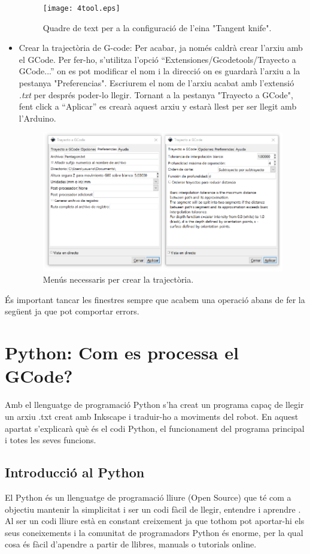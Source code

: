 \begin{itemize}
	\begin{figure}[H]
		\centering
		\texttt{[image: 4tool.eps]}
		\caption{Quadre de text per a la configuració de l'eina "Tangent knife".}
		\label{fig:tool}
	\end{figure}
	
	\item Crear la trajectòria de G-code: Per acabar, ja només caldrà crear l'arxiu amb el GCode. Per fer-ho, s'utilitza l'opció “Extensiones/Gcodetools/Trayecto a GCode...” on es pot modificar el nom i la direcció on es guardarà l'arxiu a la pestanya "Preferencias". Escriurem el nom de l'arxiu acabat amb l'extensió \emph{.txt} per després poder-lo llegir. Tornant a la pestanya "Trayecto a GCode", fent click a  “Aplicar” es crearà aquest arxiu y estarà llest per ser llegit amb l'Arduino.
	
	\begin{figure}[H]
		\centering
		\includegraphics[width=0.60\linewidth]{5Trajectoria.eps}
		\caption{Menús necessaris per crear la trajectòria.}
		\label{fig:trayecto}
	\end{figure}
	
\end{itemize}
És important tancar les finestres sempre que acabem una operació abans de fer la següent ja que pot comportar errors. 

\section{Python: Com es processa el GCode?}

Amb el llenguatge de programació Python s’ha creat un programa capaç de llegir un arxiu .txt creat amb Inkscape i traduir-ho a moviments del robot. En aquest apartat s’explicarà què és el codi Python, el funcionament del programa principal i totes les seves funcions. 

\subsection{Introducció al Python}
El Python és un llenguatge de programació lliure (Open Source) que té com a objectiu mantenir la simplicitat i ser un codi fàcil de llegir, entendre i aprendre \cite{mariadolorsayalavallesp2016} \cite{jeffreyelknerallenb.downeyichrismeyers2012}. Al ser un codi lliure està en constant creixement ja que tothom pot aportar-hi els seus coneixements i la comunitat de programadors Python és enorme, per la qual cosa és fàcil d’apendre a partir de llibres, manuals o tutorials online. 

